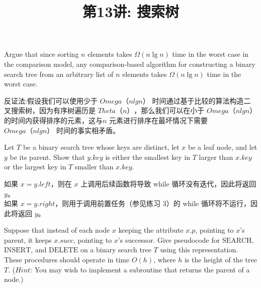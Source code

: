 \documentclass[a4paper, justified]{tufte-handout}
\title{第13讲: 搜索树}
\date{\zhtoday} %
\begin{document}
\maketitle
\noplagiarism %
\begin{abstract}
\end{abstract}
\beginrequired

\begin{problem}[TC 12.1-5]
Argue that since sorting $n$ elements takes $\Omega(n\lg n)$ time in the worst case in the comparison model, any comparison-based algorithm for constructing a binary search tree from an arbitrary list of $n$ elements takes $\Omega(n\lg n)$ time in the worst case.
\end{problem}

\begin{solution}
  反证法:假设我们可以使用少于 $Omega（nlg n）$ 时间通过基于比较的算法构造二叉搜索树，因为有序树遍历是 $Theta（n）$，那么我们可以在小于 $Omega（nlg n）$ 的时间内获得排序的元素，这与$n$ 元素进行排序在最坏情况下需要 $Omega（nlg n）$ 时间的事实相矛盾。
\end{solution}

\begin{problem}[TC 12.2-9]
Let $T$ be a binary search tree whose keys are distinct, let $x$ be a leaf node, and let $y$ be its parent. Show that $y.key$ is either the smallest key in $T$ larger than $x.key$ or the largest key in $T$ smaller than $x.key$.
\end{problem}

\begin{solution}
  如果 $x = y.left$，则在 $x$ 上调用后续函数将导致 while 循环没有迭代，因此将返回 $y$。\\
  如果 $x = y.right$，则用于调用前置任务（参见练习 3）的 while 循环将不运行，因此将返回 $y$。
\end{solution}

\begin{problem}[TC 12.3-5]
Suppose that instead of each node $x$ keeping the attribute $x.p$, pointing to $x$'s parent, it keeps $x.succ$, pointing to $x$'s successor. Give pseudocode for $\text{SEARCH}$, $\text{INSERT}$, and $\text{DELETE}$ on a binary search tree $T$ using this representation. These procedures should operate in time $O(h)$, where $h$ is the height of the tree $T$. ($\textit{Hint:}$ You may wish to implement a subroutine that returns the parent of a node.)
\end{problem}
\end{document}
